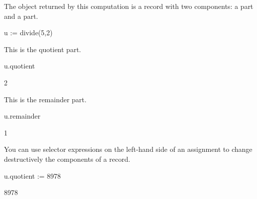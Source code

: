 %
\begin{xtc}
\begin{xtccomment}
The object returned by this computation is a record with two components: a
 part and a  part.
\end{xtccomment}
\begin{spadsrc}
u := divide(5,2) 
\end{spadsrc}
\begin{TeXOutput}
\begin{fricasmath}{1}
%
\end{fricasmath}
\end{TeXOutput}
\end{xtc}
%
\begin{xtc}
\begin{xtccomment}
This is the quotient part.
\end{xtccomment}
\begin{spadsrc}
u.quotient 
\end{spadsrc}
\begin{TeXOutput}
\begin{fricasmath}{2}
2%
\end{fricasmath}
\end{TeXOutput}
\end{xtc}
\begin{xtc}
\begin{xtccomment}
This is the remainder part.
\end{xtccomment}
\begin{spadsrc}
u.remainder 
\end{spadsrc}
\begin{TeXOutput}
\begin{fricasmath}{3}
1%
\end{fricasmath}
\end{TeXOutput}
\end{xtc}
%
\begin{xtc}
\begin{xtccomment}
You can use selector expressions on the left-hand side of an assignment
to change destructively the components of a record.
\end{xtccomment}
\begin{spadsrc}
u.quotient := 8978 
\end{spadsrc}
\begin{TeXOutput}
\begin{fricasmath}{4}
8978%
\end{fricasmath}
\end{TeXOutput}
\end{xtc}
